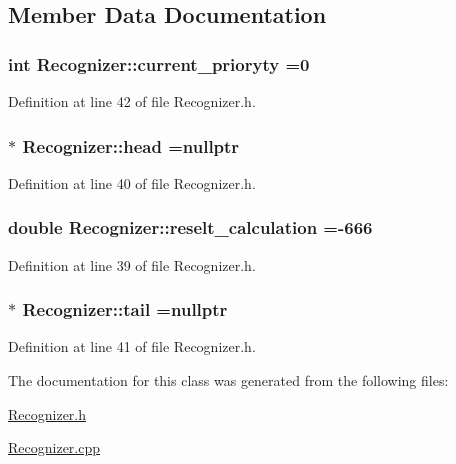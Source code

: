 \subsection{Member Data Documentation}
\hypertarget{classRecognizer_a64d6c41524ae1269968052d3af172221}{}
\subsubsection[{current\+\_\+prioryty}]{\setlength{\rightskip}{0pt plus 5cm}int Recognizer\+::current\+\_\+prioryty =0\hspace{0.3cm}{\ttfamily [private]}}\label{classRecognizer_a64d6c41524ae1269968052d3af172221}


Definition at line 42 of file Recognizer.\+h.

\hypertarget{classRecognizer_a57472dc57c50868b264c1aad83499e8c}{}
\subsubsection[{head}]{$\ast$ Recognizer\+::head =nullptr\hspace{0.3cm}{\ttfamily [private]}}\label{classRecognizer_a57472dc57c50868b264c1aad83499e8c}


Definition at line 40 of file Recognizer.\+h.

\hypertarget{classRecognizer_a6b70dee4d16fa7a8dfa6a20ed51619c0}{}
\subsubsection[{reselt\+\_\+calculation}]{\setlength{\rightskip}{0pt plus 5cm}double Recognizer\+::reselt\+\_\+calculation =-\/666\hspace{0.3cm}{\ttfamily [private]}}\label{classRecognizer_a6b70dee4d16fa7a8dfa6a20ed51619c0}


Definition at line 39 of file Recognizer.\+h.

\hypertarget{classRecognizer_a123b3de09c7231ee0344328732fa5e13}{}
\subsubsection[{tail}]{$\ast$ Recognizer\+::tail =nullptr\hspace{0.3cm}{\ttfamily [private]}}\label{classRecognizer_a123b3de09c7231ee0344328732fa5e13}


Definition at line 41 of file Recognizer.\+h.



The documentation for this class was generated from the following files\+:\begin{DoxyCompactItemize}
\item 
\hyperlink{Recognizer_8h}{Recognizer.\+h}\item 
\hyperlink{Recognizer_8cpp}{Recognizer.\+cpp}\end{DoxyCompactItemize}

